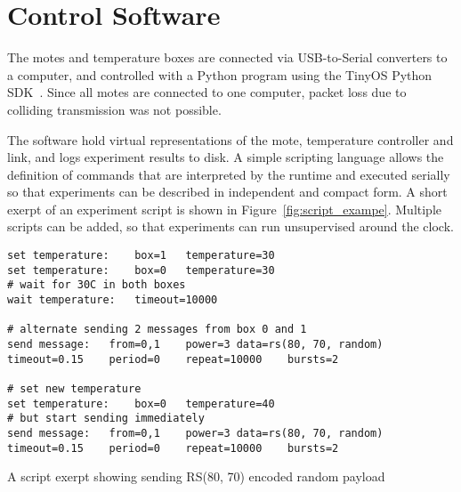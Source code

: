 \section{Control Software}

The motes and temperature boxes are connected via USB-to-Serial converters to a computer, and controlled with a Python program using the TinyOS Python SDK~\cite{tinyos.net}.
Since all motes are connected to one computer, packet loss due to colliding transmission was not possible. 

The software hold virtual representations of the mote, temperature controller and link, and logs experiment results to disk.
A simple scripting language allows the definition of commands that are interpreted by the runtime and executed serially so that experiments can be described in independent and compact form.
A short exerpt of an experiment script is shown in Figure~\ref{fig:script_exampe}.
Multiple scripts can be added, so that experiments can run unsupervised around the clock.


\begin{listing}[h]
\begin{lstlisting}[breaklines=true]
set temperature:	box=1	temperature=30
set temperature:	box=0	temperature=30
# wait for 30C in both boxes
wait temperature:	timeout=10000

# alternate sending 2 messages from box 0 and 1
send message:	from=0,1	power=3	data=rs(80, 70, random)	timeout=0.15	period=0	repeat=10000	bursts=2

# set new temperature
set temperature:	box=0	temperature=40
# but start sending immediately
send message:	from=0,1	power=3	data=rs(80, 70, random)	timeout=0.15	period=0	repeat=10000	bursts=2
\end{lstlisting}
\caption{A script exerpt showing sending RS(80, 70) encoded random payload}
\label{lst:script_example}
\end{listing}


